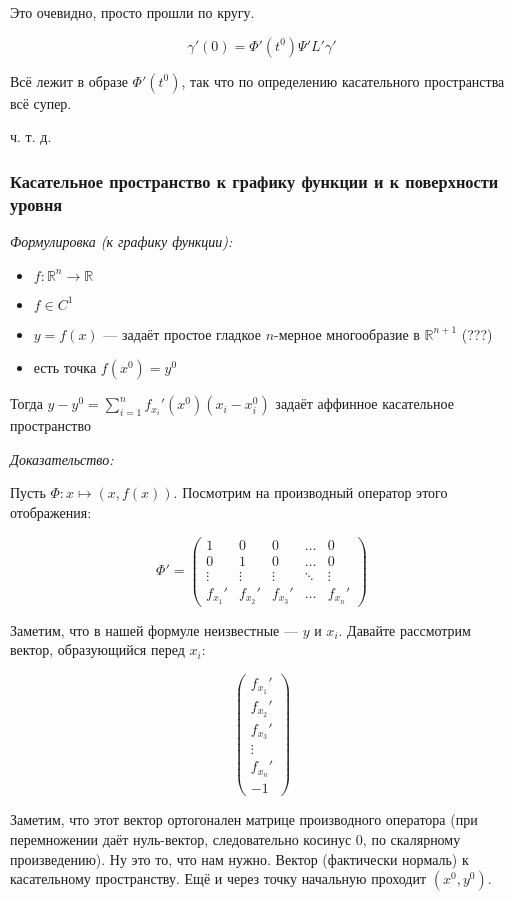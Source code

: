 \documentclass{article}
\begin{document}
Это очевидно, просто прошли по кругу.

\[\gamma'(0) = \Phi'(t^0)\Psi' L' \gamma'\]

Всё лежит в образе $\Phi'(t^0)$, так что по определению касательного пространства всё супер.

ч. т. д.

\subsubsection{Касательное пространство к графику функции и к поверхности уровня}
\textit{Формулировка (к графику функции):}

\begin{itemize}
    \item $f: \mathbb{R}^n \rightarrow \mathbb{R}$
    \item $f \in C^1$
    \item $y = f(x)$ --- задаёт простое гладкое $n$-мерное многообразие в $\mathbb{R}^{n + 1}$ (???)
    \item есть точка $f(x^0) = y^0$
\end{itemize}

Тогда $y - y^0 = \sum_{i = 1}^n{f_{x_i}'(x^0)(x_i - x^0_i)}$ задаёт аффинное касательное пространство

\textit{Доказательство:}

Пусть $\Phi: x \mapsto (x, f(x))$. Посмотрим на производный оператор этого отображения:

\[\Phi' = \begin{pmatrix}
    1 & 0 & 0 & \ldots & 0 \\
    0 & 1 & 0 & \ldots & 0 \\
    \vdots & \vdots & \vdots & \ddots & \vdots \\
    f_{x_1}' & f_{x_2}' & f_{x_3}' & \ldots & f_{x_n}'
\end{pmatrix}\]

Заметим, что в нашей формуле неизвестные --- $y$ и $x_i$. Давайте рассмотрим вектор, образующийся перед $x_i$:

\[\begin{pmatrix}
    f_{x_1}' \\
    f_{x_2}' \\
    f_{x_3}' \\
    \vdots \\
    f_{x_n}' \\
    -1
\end{pmatrix}\]

Заметим, что этот вектор ортогонален матрице производного оператора (при перемножении даёт нуль-вектор, следовательно косинус 0, по скалярному произведению). Ну это то, что нам нужно. Вектор (фактически нормаль) к касательному пространству. Ещё и через точку начальную проходит $(x^0, y^0)$.
\end{document}
